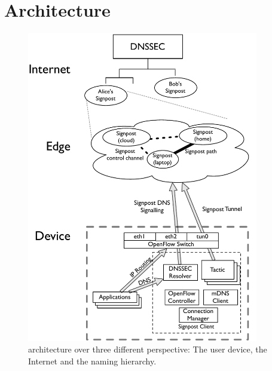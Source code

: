 \section{\signpost Architecture}\label{sec:signpost-architecture}

\begin{figure}
  \begin{center}
	\includegraphics[width=0.9\textwidth]{Chapter3/Chapter3Figs/signpost-arch}
  \end{center}
  \caption[\signpost architecture.]{\signpost architecture over three different
    perspective: The user device, the Internet and the naming hierarchy.}
  \label{fig:signpost-arch}
\end{figure}

